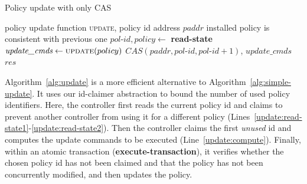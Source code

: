\documentclass[conference]{sigcomm-alternate}
\newcommand{\paddr}{\textit{paddr}\xspace}
\newcommand{\pid}{\textit{pol-id}\xspace}
\newcommand{\ufunc}{update} %
\newcommand{\liron}[1]{\textit{\textcolor{mypurple}{[liron]: #1}}} %
\newcommand{\petr}[1]{\textit{\textcolor{blue}{[petr]: #1}}} %
\newcommand{\execatomic}{\textbf{execute-transaction}}
\newcommand{\ack}{\textit{ack}}
\begin{document}


{\small
\begin{algorithm}[t]
    \caption{Policy update with only CAS}
    \label{alg:simple-update}
    \begin{algorithmic}[1]
    \Require policy update function \textsc{\ufunc}, policy id address $\paddr$
    \Ensure installed policy is consistent with previous one
 		\Repeat
 			\State $\pid,\textit{policy}\gets$ \textbf{read-state} %
 			\State $\textit{update\_cmds}\gets \textsc{\ufunc}(policy)$
 			\startTxn
	 			\State $CAS(\paddr,\pid,\pid+1)$,
	 			\State $\textit{update\_cmds}$ %
 			\endTxn
     	\Until{$\textit{res}=\ack$}
			\Return $\textit{res}$

    \end{algorithmic}
\end{algorithm}
}



Algorithm~\ref{alg:update} is a more efficient alternative 
to Algorithm~\ref{alg:simple-update}. It uses our id-claimer abstraction
to bound the number of used policy identifiers.
Here, the controller first reads the current policy id and claims to prevent another controller from using it 
for a
different policy (Lines~\ref{update:read-state1}-\ref{update:read-state2}).
Then the controller claims the first \emph{unused} id and computes the update commands to be executed (Line~\ref{update:compute}).
Finally, within an atomic transaction (\textbf{\execatomic}), it verifies whether the chosen policy id has not
been claimed and that
the policy has not been concurrently modified, and then updates the policy.
\end{document}
